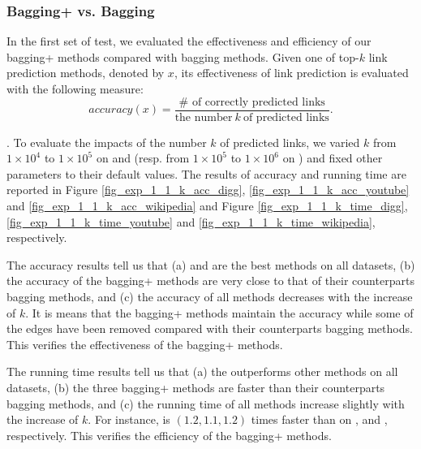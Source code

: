 \subsubsection{Bagging+ vs. Bagging}
In the first set of test, we evaluated the effectiveness and efficiency of our bagging+ methods
compared with bagging methods. Given one of top-$k$ link prediction methods, denoted by $x$, its effectiveness
of link prediction is evaluated with the following measure:
\begin{equation}
accuracy(x) = \frac{\# \textrm{ of correctly predicted links}}{\textrm{the number} \ k\ \textrm{of predicted links}}.
\end{equation}


. To evaluate the impacts of the number $k$ of
predicted links, we varied $k$ from $1\times 10^4$ to $1\times 10^5$ on \Digg
and \YouTube (resp. from $1\times 10^5$ to $1\times 10^6$ on \Wikipedia)
and fixed other parameters to their default values.
The results of accuracy and running time are reported in Figure \ref{fig_exp_1_1_k_acc_digg},
\ref{fig_exp_1_1_k_acc_youtube} and \ref{fig_exp_1_1_k_acc_wikipedia}
and Figure \ref{fig_exp_1_1_k_time_digg}, \ref{fig_exp_1_1_k_time_youtube} and
\ref{fig_exp_1_1_k_time_wikipedia}, respectively.


The accuracy results tell us that
(a) \Biased and \Biasedp are the best methods on all datasets,
(b) the accuracy of the bagging+ methods are very close to that
of their counterparts bagging methods, and (c) the accuracy of all
methods decreases with the increase of $k$. It is means that the
bagging+ methods maintain the accuracy while some of the
edges have been removed compared with their counterparts bagging methods.
This verifies the effectiveness of the bagging+ methods.


The running time results tell us that (a) the \Biasedp outperforms
other methods on all datasets, (b) the three bagging+ methods are faster
than their counterparts bagging methods, and (c) the running time of all
methods increase slightly with the increase of $k$. For instance,
\Biasedp is $(1.2, 1.1, 1.2)$ times faster than
\Biased on \Digg, \YouTube and \Wikipedia, respectively.
This verifies the efficiency of the bagging+ methods.







